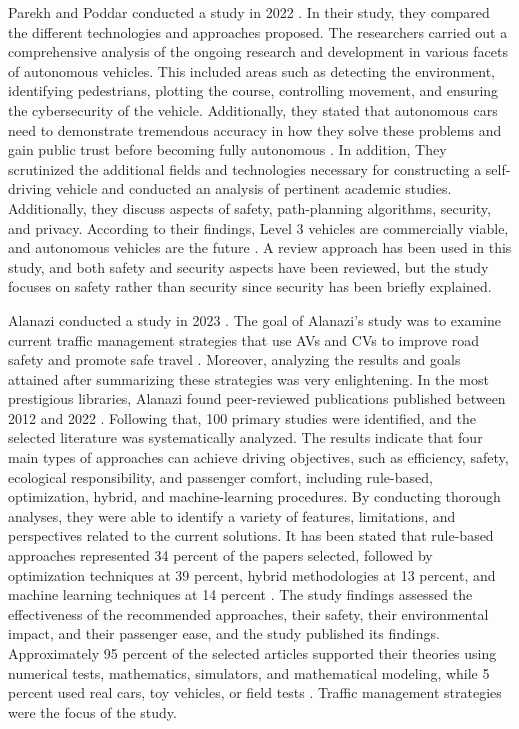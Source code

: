 \documentclass[a4paper,12pt]{article}
\begin{document}
\hspace{5mm} Parekh and Poddar conducted a study in 2022 \cite{article37}. In their study, they compared the different technologies and approaches proposed. The researchers carried out a comprehensive analysis of the ongoing research and development in various facets of autonomous vehicles. This included areas such as detecting the environment, identifying pedestrians, plotting the course, controlling movement, and ensuring the cybersecurity of the vehicle. Additionally, they stated that autonomous cars need to demonstrate tremendous accuracy in how they solve these problems and gain public trust before becoming fully autonomous \cite{article37}. In addition, They scrutinized the additional fields and technologies necessary for constructing a self-driving vehicle and conducted an analysis of pertinent academic studies. Additionally, they discuss aspects of safety, path-planning algorithms, security, and privacy. According to their findings, Level 3 vehicles are commercially viable, and autonomous vehicles are the future \cite{article37}. A review approach has been used in this study, and both safety and security aspects have been reviewed, but the study focuses on safety rather than security since security has been briefly explained.\par

Alanazi conducted a study in 2023 \cite{article38}. The goal of Alanazi's study was to examine current traffic management strategies that use AVs and CVs to improve road safety and promote safe travel \cite{article38}. Moreover, analyzing the results and goals attained after summarizing these strategies was very enlightening. In the most prestigious libraries, Alanazi found peer-reviewed publications published between 2012 and 2022 \cite{article38}. Following that, 100 primary studies were identified, and the selected literature was systematically analyzed. The results indicate that four main types of approaches can achieve driving objectives, such as efficiency, safety, ecological responsibility, and passenger comfort, including rule-based, optimization, hybrid, and machine-learning procedures. By conducting thorough analyses, they were able to identify a variety of features, limitations, and perspectives related to the current solutions. It has been stated that rule-based approaches represented 34 percent of the papers selected, followed by optimization techniques at 39 percent, hybrid methodologies at 13 percent, and machine learning techniques at 14 percent \cite{article38}. The study findings assessed the effectiveness of the recommended approaches, their safety, their environmental impact, and their passenger ease, and the study published its findings. Approximately 95 percent of the selected articles supported their theories using numerical tests, mathematics, simulators, and mathematical modeling, while 5 percent used real cars, toy vehicles, or field tests \cite{article38}. Traffic management strategies were the focus of the study.\par
\end{document}
